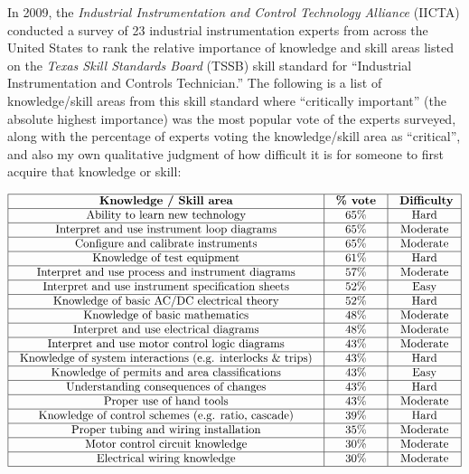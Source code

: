 \vskip 10pt

In 2009, the {\it Industrial Instrumentation and Control Technology Alliance} (IICTA) conducted a survey of 23 industrial instrumentation experts from across the United States to rank the relative importance of knowledge and skill areas listed on the {\it Texas Skill Standards Board} (TSSB) skill standard for ``Industrial Instrumentation and Controls Technician.''  The following is a list of knowledge/skill areas from this skill standard where ``critically important'' (the absolute highest importance) was the most popular vote of the experts surveyed, along with the percentage of experts voting the knowledge/skill area as ``critical'', and also my own qualitative judgment of how difficult it is for someone to first acquire that knowledge or skill:


$$\vbox{\offinterlineskip
\halign{\strut
\vrule \quad\hfil # \ \hfil & 
\vrule \quad\hfil # \ \hfil & 
\vrule \quad\hfil # \ \hfil \vrule \cr
\noalign{\hrule}
%
{\bf Knowledge / Skill area} & {\bf \% vote} & {\bf Difficulty}\cr
%
\noalign{\hrule}
%
Ability to learn new technology & 65\% & Hard \cr
%
\noalign{\hrule}
%
Interpret and use instrument loop diagrams & 65\% & Moderate \cr
%
\noalign{\hrule}
%
Configure and calibrate instruments & 65\% & Moderate \cr
%
\noalign{\hrule}
%
Knowledge of test equipment & 61\% & Hard \cr
%
\noalign{\hrule}
%
Interpret and use process and instrument diagrams & 57\% & Moderate \cr
%
\noalign{\hrule}
%
Interpret and use instrument specification sheets & 52\% & Easy \cr
%
\noalign{\hrule}
%
Knowledge of basic AC/DC electrical theory & 52\% & Hard \cr
%
\noalign{\hrule}
%
Knowledge of basic mathematics & 48\% & Moderate \cr
%
\noalign{\hrule}
%
Interpret and use electrical diagrams & 48\% & Moderate \cr
%
\noalign{\hrule}
%
Interpret and use motor control logic diagrams & 43\% & Moderate \cr
%
\noalign{\hrule}
%
Knowledge of system interactions (e.g. interlocks \& trips) & 43\% & Hard \cr
%
\noalign{\hrule}
%
Knowledge of permits and area classifications & 43\% & Easy \cr
%
\noalign{\hrule}
%
Understanding consequences of changes & 43\% & Hard \cr
%
\noalign{\hrule}
%
Proper use of hand tools & 43\% & Moderate \cr
%
\noalign{\hrule}
%
Knowledge of control schemes (e.g. ratio, cascade) & 39\% & Hard \cr
%
\noalign{\hrule}
%
Proper tubing and wiring installation & 35\% & Moderate \cr
%
\noalign{\hrule}
%
Motor control circuit knowledge & 30\% & Moderate \cr
%
\noalign{\hrule}
%
Electrical wiring knowledge & 30\% & Moderate \cr
%
\noalign{\hrule}
} %
}$$ %

